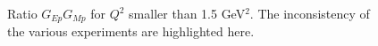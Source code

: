 \begin{figure}
\begin{center}
\caption{Ratio $G_{Ep}G_{Mp}$ for $Q^2$ smaller than 1.5 GeV$^2$. The inconsistency of the various experiments are highlighted here.}
\label{fig:gepgd_cs}
\end{center}
\end{figure}


